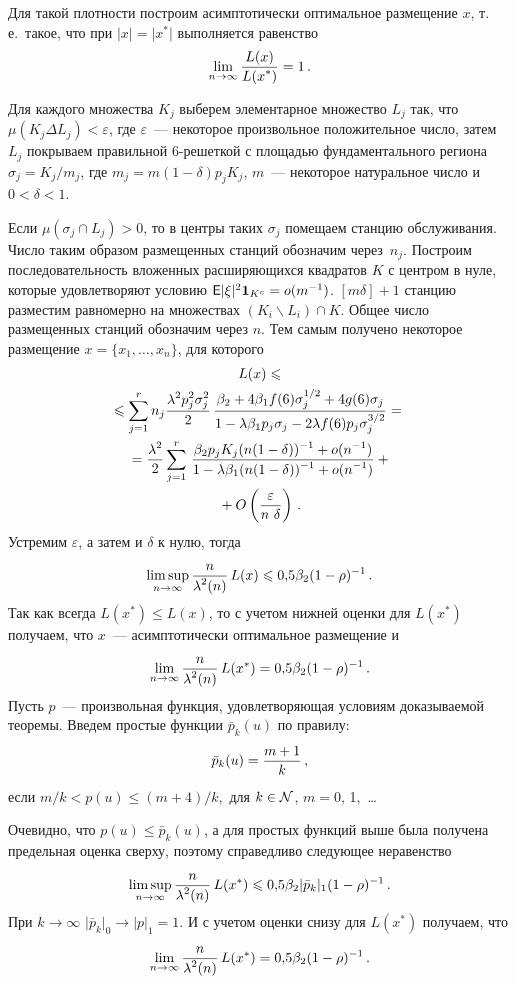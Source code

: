\begin{multicols}{2}
Для такой плотности построим асимптотически оптимальное размещение
$x$, т.\,е.\ такое, что при $\vert x\vert =\vert x^*\vert$ выполняется равенство
$$
\lim\limits_{n\to\infty} \displaystyle\frac{\displaystyle L(x)\mathstrut}{\displaystyle L(x^*)\mathstrut}=1\,.
$$

Для каждого множества $K_j$ выберем элементарное множество $L_j$
так, что $\mu(K_j \Delta L_j)<\varepsilon$, где $\varepsilon$~---
некоторое произвольное положительное число, затем $L_j$ покрываем
правильной 6-решеткой с площадью фундаментального региона
$\sigma_j=K_j/m_j$, где  $m_j=m (1-\delta) p_jK_j$,
$m$~--- некоторое натуральное число и $0<\delta<1$.

Если $\mu(\sigma_j\cap L_j)>0$, то в центры таких $\sigma_j$
помещаем станцию обслуживания. Число таким образом размещенных
станций обозначим через~$n_j$. Построим последовательность
вложенных расширяющихся квадратов $K$ с центром в нуле, которые
удовлетворяют условию ${\sf E}\vert \xi\vert^2 \textbf{1}_{K^c}=o(m^{-1})$.
$[m\delta]+1$ станцию разместим равномерно на множествах
$(K_i\backslash L_i)\cap K$. Общее число размещенных станций
обозначим через $n$. Тем самым получено некоторое размещение
$x=\{x_1,\ldots,x_n\}$, для которого
\begin{multline*}
L(x)\leqslant\\
\leqslant\sum\limits_{j=1}^{r}n_j\displaystyle\frac{\displaystyle \lambda^2 p_j^2 \sigma_j^2\mathstrut}{\displaystyle 2\mathstrut}\,
\displaystyle\frac{\displaystyle \beta_2+4\beta_1 f(6)\sigma_j^{1/2}+4g(6)\sigma_j\mathstrut}{\displaystyle 1-\lambda \beta_1 p_j \sigma_j-2\lambda f(6)p_j \sigma_j^{3/2}\mathstrut}={}\\
{} =\displaystyle\frac{\displaystyle \lambda^2\mathstrut}{\displaystyle 2\mathstrut}\sum\limits_{j=1}^{r}\, \displaystyle\frac{\displaystyle \beta_2 p_j K_j
(n(1-\delta))^{-1}+o(n^{-1})\mathstrut}{\displaystyle 1-\lambda \beta_1
(n(1-\delta))^{-1}+o(n^{-1})\mathstrut} +{}\\
{}+O\left(\displaystyle\frac{\displaystyle \varepsilon\mathstrut}{\displaystyle n~\delta\mathstrut}\right)\,.
\end{multline*}
 Устремим
$\varepsilon$, а затем и $\delta$ к нулю, тогда
$$
\limsup\limits_{n \to \infty}\displaystyle\frac{\displaystyle n\mathstrut}{\displaystyle \lambda^2(n)\mathstrut}\,L(x)\leqslant
0{,}5\beta_2(1-\rho)^{-1}\,.
$$
Так как всегда $L(x^*)\leqslant L(x)$,
то с учетом нижней оценки для $L(x^*)$ получаем, что $x$~---
асимптотически оптимальное размещение и
$$
\lim\limits_{n \to   \infty}\displaystyle\frac{\displaystyle n\mathstrut}{\displaystyle \lambda^2(n)\mathstrut}\,L(x^*) =
0{,}5\beta_2(1-\rho)^{-1}\,.
$$
Пусть $p$~--- произвольная функция, удовлетворяющая условиям
доказываемой теоремы. Введем простые функции $\bar{p}_k(u)$ по
правилу:
$$
\bar{p}_k(u)=\displaystyle\frac{\displaystyle m+1\mathstrut}{\displaystyle k\mathstrut}\,,
$$ 
если $m/k<p(u)\leqslant (m+4)/k,$ для
$k\in \cal{N}$, $m=0$, 1,~\ldots

Очевидно, что $p(u)\leqslant \bar{p}_k(u)$, а для простых
функций выше была получена предельная оценка сверху, поэтому
справедливо следующее неравенство
$$
\limsup\limits_{n \to
\infty}\displaystyle\frac{\displaystyle n\mathstrut}{\displaystyle \lambda^2(n)\mathstrut}\,L(x^*)\leqslant 0{,}5\beta_2
\vert \bar{p}_k \vert_1 (1-\rho)^{-1}\,.
$$
При $k \to \infty$
$\vert \bar{p}_k \vert_0 \to \vert p\vert_1=1$.
И с учетом
оценки снизу для $L(x^*)$ получаем, что
$$ \lim\limits_{n \to
\infty}\displaystyle\frac{\displaystyle n\mathstrut}{\displaystyle \lambda^2(n)\mathstrut}\,L(x^*) = 0{,}5\beta_2(1-\rho)^{-1}\,.
$$


\end{multicols}
